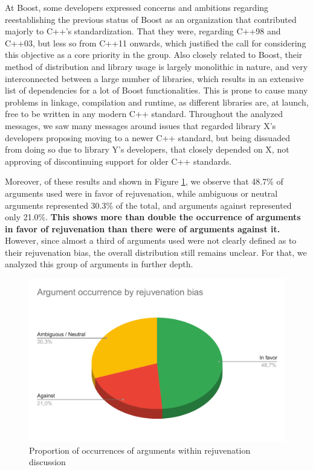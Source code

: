 At Boost, some developers expressed concerns and ambitions regarding reestablishing the previous status of Boost as an organization that contributed majorly to C++'s standardization. That they were, regarding C++98 and C++03, but less so from C++11 onwards, which justified the call for considering this objective as a core priority in the group. Also closely related to Boost, their method of distribution and library usage is largely monolithic in nature, and very interconnected between a large number of libraries, which results in an extensive list of dependencies for a lot of Boost functionalities. This is prone to cause many problems in linkage, compilation and runtime, as different libraries are, at launch, free to be written in any modern C++ standard. Throughout the analyzed messages, we saw many messages around issues that regarded library X's developers proposing moving to a newer C++ standard, but being dissuaded from doing so due to library Y's developers, that closely depended on X, not approving of discontinuing support for older C++ standards.

Moreover, of these results and shown in Figure \ref{fig:arg_occurr}, we observe that 48.7\% of arguments used were in favor of rejuvenation, while ambiguous or neutral arguments represented 30.3\% of the total, and arguments against represented only 21.0\%. \textbf{This shows more than double the occurrence of arguments in favor of rejuvenation than there were of arguments against it.} However, since almost a third of arguments used were not clearly defined as to their rejuvenation bias, the overall distribution still remains unclear. For that, we analyzed this group of arguments in further depth.

\begin{figure}[h]
  \centering
  \includegraphics[width=\linewidth]{images/arg_occurr.pdf}
  \caption{Proportion of occurrences of arguments within rejuvenation discussion}
  \label{fig:arg_occurr}
\end{figure}

